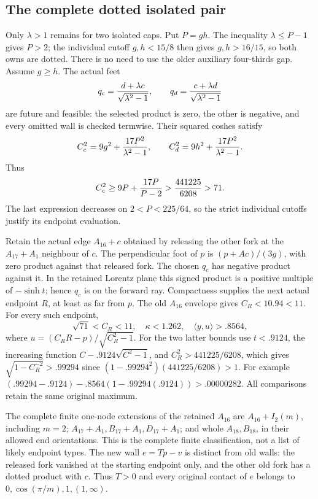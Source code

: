 \documentclass[11pt]{article}
\theoremstyle{definition}
\theoremstyle{remark}
\newcommand{\ip}[2]{\langle #1,#2\rangle}
\begin{document}
\subsection{The complete dotted isolated pair}
\label{app:D18isolateddotted}

Only \(\lambda>1\) remains for two isolated caps.
Put \(P=gh\).  The inequality \(\lambda\le P-1\)
gives \(P>2\); the individual cutoff \(g,h<15/8\)
then gives \(g,h>16/15\), so both owns are dotted.
There is no need to use the older auxiliary four-thirds gap.
Assume \(g\ge h\).
The actual feet
\[
 q_c={d+\lambda c\over\sqrt{\lambda^2-1}},\qquad
 q_d={c+\lambda d\over\sqrt{\lambda^2-1}}
\]
are future and feasible: the selected product is zero, the other
is negative, and every omitted wall is checked termwise.
Their squared coshes satisfy
\[
 C_c^2=9g^2+{17P^2\over\lambda^2-1},\qquad
 C_d^2=9h^2+{17P^2\over\lambda^2-1}.
\]
Thus
\[
 C_c^2\ge9P+{17P\over P-2}
 >{441225\over6208}>71.
\]
The last expression decreases on \(2<P<225/64\), so the strict
individual cutoffs justify its endpoint evaluation.

Retain the actual edge \(A_{16}+c\) obtained by releasing the other
fork at the \(A_{17}+A_1\) neighbour of \(c\).
The perpendicular foot of \(p\) is
\((p+Ac)/(3g)\), with zero product against that released fork.
The chosen \(q_c\) has negative product against it.
In the retained Lorentz plane this signed product is a positive
multiple of \(-\sinh t\); hence \(q_c\) is on the forward ray.
Compactness supplies the next actual endpoint \(R\), at least as
far from \(p\).  The old \(A_{16}\) envelope gives \(C_R<10.94<11\).
For every such endpoint,
\[
 \sqrt{71}<C_R<11,\quad
 \kappa<1.262,\quad \ip yu>.8564 ,
\tag{DIIdot}\label{eq:DIIdot}
\]
where \(u=(C_RR-p)/\sqrt{C_R^2-1}\).
For the two latter bounds use \(t<.9124\), the increasing function
\(C-.9124\sqrt{C^2-1}\), and
\(C_R^2>441225/6208\), which gives
\(\sqrt{1-C_R^{-2}}>.99294\) since
\((1-.99294^2)(441225/6208)>1\).
For example
\((.99294-.9124)-.8564(1-.99294(.9124))>.00000282\).
All comparisons retain the same original maximum.

The complete finite one-node extensions of the retained \(A_{16}\)
are \(A_{16}+I_2(m)\), including \(m=2\);
\(A_{17}+A_1,B_{17}+A_1,D_{17}+A_1\);
and whole \(A_{18},B_{18}\), in their allowed end orientations.
This is the complete finite classification, not a list of likely
endpoint types.  The new wall \(e=Tp-v\) is distinct from old
walls: the released fork vanished at the starting endpoint only,
and the other old fork has a dotted product with \(c\).
Thus \(T>0\) and every original contact of \(e\) belongs to
\(0,\cos(\pi/m),1,(1,\infty)\).
\end{document}
